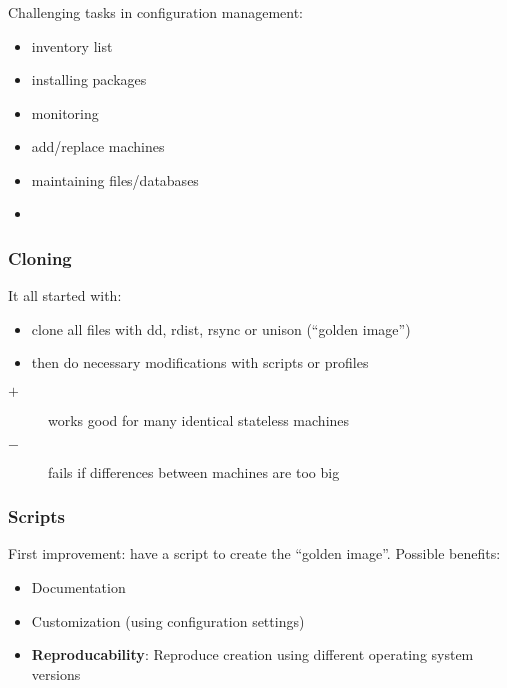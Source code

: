 \begin{frame}
	\frametitle{}

	Challenging tasks in configuration management:

	\pause

	\begin{itemize}
	\item inventory list
	\item installing packages
	\item monitoring
	\item add/replace machines
	\item maintaining files/databases
	\item {}
	\end{itemize}
\end{frame}



\begin{frame}
	\frametitle{Cloning}

	It all started with:

	\begin{itemize}
	\item clone all files with dd, rdist, rsync or unison (``golden image'')
	\item then do necessary modifications with scripts or profiles
	\end{itemize}

	\pause

	\begin{description}
	\item[$+$] works good for many identical stateless machines
	\item[$-$] fails if differences between machines are too big
	\end{description}
\end{frame}

\begin{frame}
	\frametitle{Scripts}

	First improvement: have a script to create the ``golden image''.
	Possible benefits:

	\begin{itemize}[<+-| alert@+>]
	\item Documentation
	\item Customization (using configuration settings)
	\item \textbf{Reproducability}: Reproduce creation using different operating system versions
	\end{itemize}
\end{frame}

